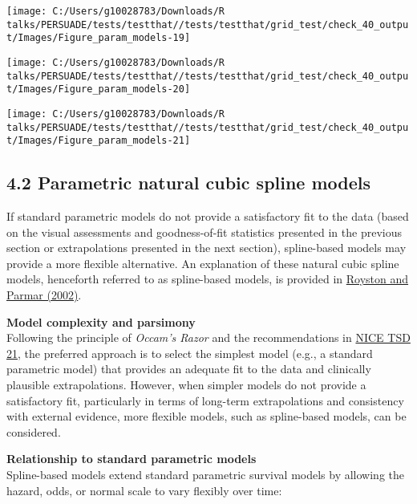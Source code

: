 \documentclass[
]{article}
\begin{document}
\begin{flushleft}\texttt{[image: C:/Users/g10028783/Downloads/R talks/PERSUADE/tests/testthat//tests/testthat/grid\_test/check\_40\_output/Images/Figure\_param\_models-19]} \end{flushleft}

\begin{flushleft}\texttt{[image: C:/Users/g10028783/Downloads/R talks/PERSUADE/tests/testthat//tests/testthat/grid\_test/check\_40\_output/Images/Figure\_param\_models-20]} \end{flushleft}

\begin{flushleft}\texttt{[image: C:/Users/g10028783/Downloads/R talks/PERSUADE/tests/testthat//tests/testthat/grid\_test/check\_40\_output/Images/Figure\_param\_models-21]} \end{flushleft}

\clearpage

\subsection{4.2 Parametric natural cubic spline
models}\label{parametric-natural-cubic-spline-models}

If standard parametric models do not provide a satisfactory fit to the
data (based on the visual assessments and goodness-of-fit statistics
presented in the previous section or extrapolations presented in the
next section), spline-based models may provide a more flexible
alternative. An explanation of these natural cubic spline models,
henceforth referred to as spline-based models, is provided in
\href{https://doi.org/10.1002/sim.1203}{Royston and Parmar (2002)}.

\textbf{Model complexity and parsimony}\\
Following the principle of \emph{Occam's Razor} and the recommendations
in
\href{https://www.sheffield.ac.uk/media/34188/download?attachment}{NICE
TSD 21}, the preferred approach is to select the simplest model (e.g., a
standard parametric model) that provides an adequate fit to the data and
clinically plausible extrapolations. However, when simpler models do not
provide a satisfactory fit, particularly in terms of long-term
extrapolations and consistency with external evidence, more flexible
models, such as spline-based models, can be considered.

\textbf{Relationship to standard parametric models}\\
Spline-based models extend standard parametric survival models by
allowing the hazard, odds, or normal scale to vary flexibly over time:
\end{document}
